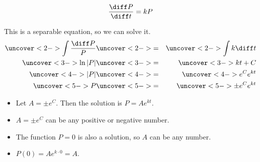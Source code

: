 \begin{frame}
\[
\frac{\diff P}{\diff t} = kP
\]

This is a separable equation, so we can solve it.
\abovedisplayskip=0pt
\belowdisplayskip=0pt
\begin{eqnarray*}
\uncover<2->{%
\int \frac{\diff P}{P}%
}%
& \uncover<2->{ = } &%
\uncover<2->{%
\int k\diff t%
}\\%
\uncover<3->{%
\ln |P|%
}%
& \uncover<3->{ = } &%
\uncover<3->{%
kt + C%
}\\%
\uncover<4->{%
 |P|%
}%
& \uncover<4->{ = } &%
\uncover<4->{%
e^Ce^{kt}%
}\\%
\uncover<5->{%
 P%
}%
& \uncover<5->{ = } &%
\uncover<5->{%
\pm e^Ce^{kt}%
}%
\end{eqnarray*}
\begin{itemize}
\item<6->  Let $A = \pm e^C$.  Then the solution is $P = A e^{kt}$.
\item<7->  $A = \pm e^C$ can be any positive or negative number.
\item<8->  The function $P = 0$ is also a solution, so $A$ can be any number.
\item<9->  $P(0) = Ae^{k\cdot 0} = A$.
\end{itemize}
%
\end{frame}
